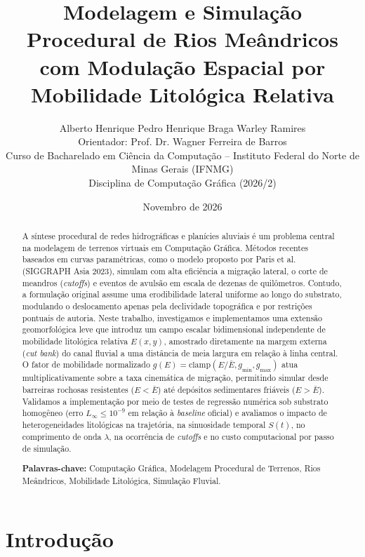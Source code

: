 \documentclass[10pt,twocolumn,a4paper]{article}
\title{\textbf{Modelagem e Simulação Procedural de Rios Meândricos com Modulação Espacial por Mobilidade Litológica Relativa}}
\author{
    Alberto Henrique \quad Pedro Henrique Braga \quad Warley Ramires \\[0.3em]
    \small Orientador: Prof. Dr. Wagner Ferreira de Barros \\
    \small Curso de Bacharelado em Ciência da Computação -- Instituto Federal do Norte de Minas Gerais (IFNMG) \\
    \small Disciplina de Computação Gráfica (2026/2)
}
\date{Novembro de 2026}
\begin{document}
\maketitle

\begin{abstract}
\noindent
A síntese procedural de redes hidrográficas e planícies aluviais é um problema central na modelagem de terrenos virtuais em Computação Gráfica. Métodos recentes baseados em curvas paramétricas, como o modelo proposto por Paris et al. (SIGGRAPH Asia 2023), simulam com alta eficiência a migração lateral, o corte de meandros (\textit{cutoffs}) e eventos de avulsão em escala de dezenas de quilômetros. Contudo, a formulação original assume uma erodibilidade lateral uniforme ao longo do substrato, modulando o deslocamento apenas pela declividade topográfica e por restrições pontuais de autoria. Neste trabalho, investigamos e implementamos uma extensão geomorfológica leve que introduz um campo escalar bidimensional independente de mobilidade litológica relativa $E(x,y)$, amostrado diretamente na margem externa (\textit{cut bank}) do canal fluvial a uma distância de meia largura em relação à linha central. O fator de mobilidade normalizado $g(E) = \text{clamp}(E / \bar{E}, g_{\min}, g_{\max})$ atua multiplicativamente sobre a taxa cinemática de migração, permitindo simular desde barreiras rochosas resistentes ($E < \bar{E}$) até depósitos sedimentares friáveis ($E > \bar{E}$). Validamos a implementação por meio de testes de regressão numérica sob substrato homogêneo (erro $L_\infty \le 10^{-9}$ em relação à \textit{baseline} oficial) e avaliamos o impacto de heterogeneidades litológicas na trajetória, na sinuosidade temporal $S(t)$, no comprimento de onda $\lambda$, na ocorrência de \textit{cutoffs} e no custo computacional por passo de simulação.

\vspace{0.5em}
\noindent\textbf{Palavras-chave:} Computação Gráfica, Modelagem Procedural de Terrenos, Rios Meândricos, Mobilidade Litológica, Simulação Fluvial.
\end{abstract}

\section{Introdução}
\label{sec:introducao}
\end{document}

